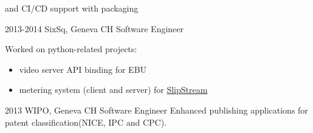 \documentclass[]{friggeri}
\begin{document}
\begin{entrylist}
{\begin{itemize}
        and CI/CD support with packaging
    \end{itemize}}
  \entry
    {2013-2014}
    {SixSq, Geneva CH}
    {Software Engineer}
    {Worked on python-related projects:
    \begin{itemize}
    \item video server API binding for \ac{EBU}
    \item metering system (client and server) for
    \href{http://sixsq.com/products/slipstream.html}{SlipStream{\texttrademark}}
    \end{itemize}}
  \entry
    {2013}
    {\ac{WIPO}, Geneva CH}
    {Software Engineer}
    {Enhanced publishing applications for patent classification(NICE, IPC
    and CPC).}
\end{entrylist}

\clearpage
\end{document}

